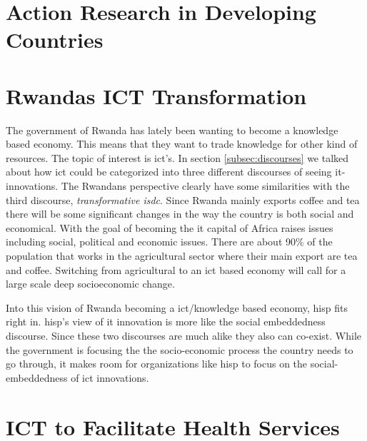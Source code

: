 \section{Action Research in Developing Countries}

\section{Rwandas ICT Transformation}
The government of Rwanda has lately been wanting to become a knowledge based economy. 
This means that they want to trade knowledge for other kind of resources. 
The topic of interest is \gls{ict}'s.
In section \ref{subsec:discourses} we talked about how \gls{ict} could be categorized into three different discourses of seeing \gls{it}-innovations. 
The Rwandans perspective clearly have some similarities with the third discourse, \textit{transformative \gls{isdc}}. 
Since Rwanda mainly exports coffee and tea there will be some significant changes in the way the country is both social and economical. 
With the goal of becoming the \gls{it} capital of Africa raises issues including social, political and economic issues. 
There are about 90\% of the population that works in the agricultural sector where their main export are tea and coffee. 
Switching from agricultural to an \gls{ict} based economy will call for a large scale deep socioeconomic change.

Into this vision of Rwanda becoming a \gls{ict}/knowledge based economy, \gls{hisp} fits right in.
\gls{hisp}'s view of \gls{it} innovation is more like the social embeddedness discourse.
Since these two discourses are much alike they also can co-exist. While the government is focusing the the socio-economic process the country needs to go through, it makes room for organizations like \gls{hisp} to focus on the social-embeddedness of \gls{ict} innovations.

\cite{overview:rdb}
\cite{rw:snl}

\section{ICT to Facilitate Health Services}

\cite{ehealth:blaya}
